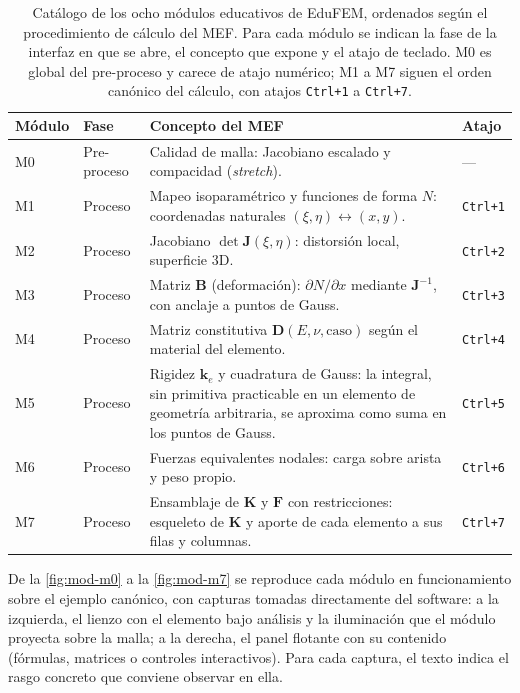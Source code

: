 \begin{table}[htbp]
\centering
\caption[Catálogo de los ocho módulos educativos de EduFEM.]{Catálogo de los ocho módulos educativos de EduFEM, ordenados según el procedimiento de cálculo del MEF. Para cada módulo se indican la fase de la interfaz en que se abre, el concepto que expone y el atajo de teclado. M0 es global del pre-proceso y carece de atajo numérico; M1 a M7 siguen el orden canónico del cálculo, con atajos \texttt{Ctrl+1} a \texttt{Ctrl+7}.}
\label{tab:modulos-edu}
\begin{tabular}{l l p{6.2cm} l}
\toprule
\textbf{Módulo} & \textbf{Fase} & \textbf{Concepto del MEF} & \textbf{Atajo} \\
\midrule
M0 & Pre-proceso  & Calidad de malla: Jacobiano escalado y compacidad (\emph{stretch}). & --- \\
M1 & Proceso      & Mapeo isoparamétrico y funciones de forma $N$: coordenadas naturales $(\xi,\eta) \leftrightarrow (x,y)$. & \texttt{Ctrl+1} \\
M2 & Proceso      & Jacobiano $\det\bm{J}(\xi,\eta)$: distorsión local, superficie 3D. & \texttt{Ctrl+2} \\
M3 & Proceso      & Matriz $\bm{B}$ (deformación): $\partial N/\partial x$ mediante $\bm{J}^{-1}$, con anclaje a puntos de Gauss. & \texttt{Ctrl+3} \\
M4 & Proceso      & Matriz constitutiva $\bm{D}(E,\nu,\text{caso})$ según el material del elemento. & \texttt{Ctrl+4} \\
M5 & Proceso      & Rigidez $\bm{k}_e$ y cuadratura de Gauss: la integral, sin primitiva practicable en un elemento de geometría arbitraria, se aproxima como suma en los puntos de Gauss. & \texttt{Ctrl+5} \\
M6 & Proceso      & Fuerzas equivalentes nodales: carga sobre arista y peso propio. & \texttt{Ctrl+6} \\
M7 & Proceso      & Ensamblaje de $\bm{K}$ y $\bm{F}$ con restricciones: esqueleto de $\bm{K}$ y aporte de cada elemento a sus filas y columnas. & \texttt{Ctrl+7} \\
\bottomrule
\end{tabular}
\end{table}


De la \autoref{fig:mod-m0} a la \autoref{fig:mod-m7} se reproduce cada módulo en funcionamiento sobre el ejemplo canónico, con capturas tomadas directamente del software: a la izquierda, el lienzo con el elemento bajo análisis y la iluminación que el módulo proyecta sobre la malla; a la derecha, el panel flotante con su contenido (fórmulas, matrices o controles interactivos). Para cada captura, el texto indica el rasgo concreto que conviene observar en ella.

